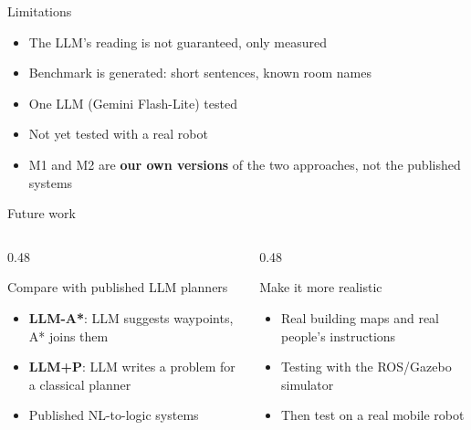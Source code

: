 \documentclass[aspectratio=169]{beamer}
\begin{document}
\begin{frame}{Limitations}
  \begin{itemize}
    \item The LLM's reading is not guaranteed, only measured
    \item Benchmark is generated: short sentences, known room names
    \item One LLM (Gemini Flash-Lite) tested
    \item Not yet tested with a real robot
    \item M1 and M2 are \textbf{our own versions} of the two approaches,
      not the published systems
  \end{itemize}
\end{frame}

\begin{frame}{Future work}
  \begin{columns}[T]
    \begin{column}{0.48\textwidth}
      \begin{block}{Compare with published LLM planners}
        \begin{itemize}
          \item \textbf{LLM-A*}: LLM suggests waypoints, A* joins them
          \item \textbf{LLM+P}: LLM writes a problem for a classical planner
          \item Published NL-to-logic systems
        \end{itemize}
      \end{block}
    \end{column}
    \begin{column}{0.48\textwidth}
      \begin{block}{Make it more realistic}
        \begin{itemize}
          \item Real building maps and real people's instructions
          \item Testing with the ROS/Gazebo simulator
          \item Then test on a real mobile robot
        \end{itemize}
      \end{block}
    \end{column}
  \end{columns}

\end{frame}
\end{document}
